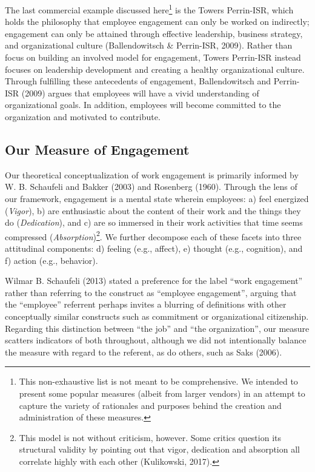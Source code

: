 \documentclass[
  man]{apa7}
\begin{document}
The last commercial example discussed here\footnote{This non-exhaustive list is not meant to be comprehensive. We intended to present some popular measures (albeit from larger vendors) in an attempt to capture the variety of rationales and purposes behind the creation and administration of these measures.} is the Towers Perrin-ISR, which holds the philosophy that employee engagement can only be worked on indirectly; engagement can only be attained through effective leadership, business strategy, and organizational culture (Ballendowitsch \& Perrin-ISR, 2009). Rather than focus on building an involved model for engagement, Towers Perrin-ISR instead focuses on leadership development and creating a healthy organizational culture. Through fulfilling these antecedents of engagement, Ballendowitsch and Perrin-ISR (2009) argues that employees will have a vivid understanding of organizational goals. In addition, employees will become committed to the organization and motivated to contribute.

\hypertarget{our-measure-of-engagement}{%
\subsection{Our Measure of Engagement}\label{our-measure-of-engagement}}

Our theoretical conceptualization of work engagement is primarily informed by W. B. Schaufeli and Bakker (2003) and Rosenberg (1960). Through the lens of our framework, engagement is a mental state wherein employees: a) feel energized (\emph{Vigor}), b) are enthusiastic about the content of their work and the things they do (\emph{Dedication}), and c) are so immersed in their work activities that time seems compressed (\emph{Absorption})\footnote{This model is not without criticism, however. Some critics question its structural validity by pointing out that vigor, dedication and absorption all correlate highly with each other (Kulikowski, 2017).}.
We further decompose each of these facets into three attitudinal components: d) feeling (e.g., affect), e) thought (e.g., cognition), and f) action (e.g., behavior).

Wilmar B. Schaufeli (2013) stated a preference for the label ``work engagement'' rather than referring to the construct as ``employee engagement'', arguing that the ``employee'' referrent perhaps invites a blurring of definitions with other conceptually similar constructs such as commitment or organizational citizenship. Regarding this distinction between ``the job'' and ``the organization'', our measure scatters indicators of both throughout, although we did not intentionally balance the measure with regard to the referent, as do others, such as Saks (2006).
\end{document}
